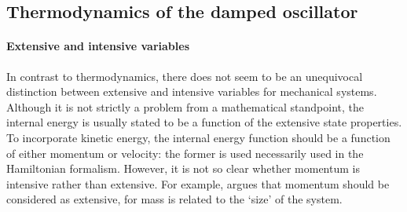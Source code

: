 \subsection{Thermodynamics of the damped oscillator}
\label{ssec:thermo_dho}
\paragraph{Extensive and intensive variables} In contrast to thermodynamics, there does not seem to be an unequivocal distinction between extensive and intensive variables for mechanical systems. Although it is not strictly a problem from a mathematical standpoint, the internal energy is usually stated to be a function of the extensive state properties. To incorporate kinetic energy, the internal energy function should be a function of either momentum or velocity: the former is used necessarily used in the Hamiltonian formalism. However, it is not so clear whether momentum is intensive rather than extensive. For example, \citet{Franksen1969} argues that momentum should be considered as extensive, for mass is related to the `size' of the system. 

